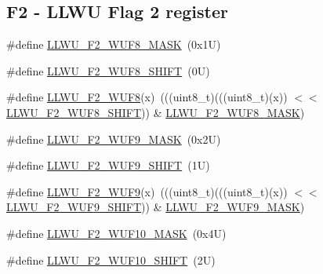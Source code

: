 \subsection*{F2 -\/ L\+L\+WU Flag 2 register}
\begin{DoxyCompactItemize}
\item 
\#define \mbox{\hyperlink{group___l_l_w_u___register___masks_ga76228bf3593a9417e43e509166c07fad}{L\+L\+W\+U\+\_\+\+F2\+\_\+\+W\+U\+F8\+\_\+\+M\+A\+SK}}~(0x1\+U)
\item 
\#define \mbox{\hyperlink{group___l_l_w_u___register___masks_ga88963ab5583725d163689b615ce5a638}{L\+L\+W\+U\+\_\+\+F2\+\_\+\+W\+U\+F8\+\_\+\+S\+H\+I\+FT}}~(0\+U)
\item 
\#define \mbox{\hyperlink{group___l_l_w_u___register___masks_gab1a2b83044edbc6852ae049d8afdfbdd}{L\+L\+W\+U\+\_\+\+F2\+\_\+\+W\+U\+F8}}(x)~(((uint8\+\_\+t)(((uint8\+\_\+t)(x)) $<$$<$ \mbox{\hyperlink{group___l_l_w_u___register___masks_ga88963ab5583725d163689b615ce5a638}{L\+L\+W\+U\+\_\+\+F2\+\_\+\+W\+U\+F8\+\_\+\+S\+H\+I\+FT}})) \& \mbox{\hyperlink{group___l_l_w_u___register___masks_ga76228bf3593a9417e43e509166c07fad}{L\+L\+W\+U\+\_\+\+F2\+\_\+\+W\+U\+F8\+\_\+\+M\+A\+SK}})
\item 
\#define \mbox{\hyperlink{group___l_l_w_u___register___masks_ga28d89e3d08f5a7db6ffbe56e9e35d771}{L\+L\+W\+U\+\_\+\+F2\+\_\+\+W\+U\+F9\+\_\+\+M\+A\+SK}}~(0x2\+U)
\item 
\#define \mbox{\hyperlink{group___l_l_w_u___register___masks_gabc3e93b75e1e8e95f392b59b5dbf6edf}{L\+L\+W\+U\+\_\+\+F2\+\_\+\+W\+U\+F9\+\_\+\+S\+H\+I\+FT}}~(1\+U)
\item 
\#define \mbox{\hyperlink{group___l_l_w_u___register___masks_ga5bf58a8c2a31c1ee83569d2cf4896d86}{L\+L\+W\+U\+\_\+\+F2\+\_\+\+W\+U\+F9}}(x)~(((uint8\+\_\+t)(((uint8\+\_\+t)(x)) $<$$<$ \mbox{\hyperlink{group___l_l_w_u___register___masks_gabc3e93b75e1e8e95f392b59b5dbf6edf}{L\+L\+W\+U\+\_\+\+F2\+\_\+\+W\+U\+F9\+\_\+\+S\+H\+I\+FT}})) \& \mbox{\hyperlink{group___l_l_w_u___register___masks_ga28d89e3d08f5a7db6ffbe56e9e35d771}{L\+L\+W\+U\+\_\+\+F2\+\_\+\+W\+U\+F9\+\_\+\+M\+A\+SK}})
\item 
\#define \mbox{\hyperlink{group___l_l_w_u___register___masks_gae005607b6cb3ebf1a7def97cd8b2abc5}{L\+L\+W\+U\+\_\+\+F2\+\_\+\+W\+U\+F10\+\_\+\+M\+A\+SK}}~(0x4\+U)
\item 
\#define \mbox{\hyperlink{group___l_l_w_u___register___masks_ga0ac579128aa08740377c46fd52be2bb5}{L\+L\+W\+U\+\_\+\+F2\+\_\+\+W\+U\+F10\+\_\+\+S\+H\+I\+FT}}~(2\+U)
\item 

\end{DoxyCompactItemize}
